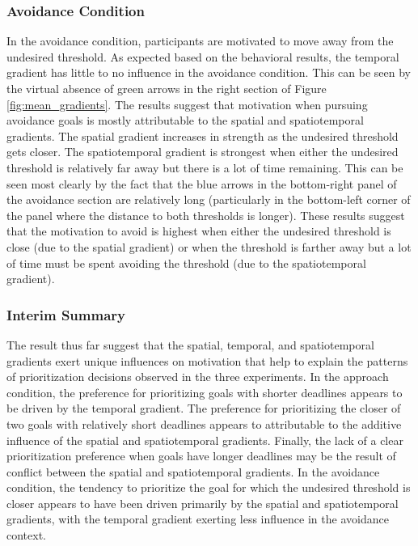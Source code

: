 \documentclass[a4paper,doc,natbib,donotrepeattitle]{apa6}
\begin{document}
\subsubsection{Avoidance Condition}

In the avoidance condition, participants are motivated to move away from the undesired threshold. As expected based on the behavioral results, the temporal gradient has little to no influence in the avoidance condition. This can be seen by the virtual absence of green arrows in the right section of Figure \ref{fig:mean_gradients}. The results suggest that motivation when pursuing avoidance goals is mostly attributable to the spatial and spatiotemporal gradients. The spatial gradient increases in strength as the undesired threshold gets closer. The spatiotemporal gradient is strongest when either the undesired threshold is relatively far away but there is a lot of time remaining. This can be seen most clearly by the fact that the blue arrows in the bottom-right panel of the avoidance section are relatively long (particularly in the bottom-left corner of the panel where the distance to both thresholds is longer). These results suggest that the motivation to avoid is highest when either the undesired threshold is close (due to the spatial gradient) or when the threshold is farther away but a lot of time must be spent avoiding the threshold (due to the spatiotemporal gradient).

\subsubsection{Interim Summary}

The result thus far suggest that the spatial, temporal, and spatiotemporal gradients exert unique influences on motivation that help to explain the patterns of prioritization decisions observed in the three experiments. In the approach condition, the preference for prioritizing goals with shorter deadlines appears to be driven by the temporal gradient. The preference for prioritizing the closer of two goals with relatively short deadlines appears to attributable to the additive influence of the spatial and spatiotemporal gradients. Finally, the lack of a clear prioritization preference when goals have longer deadlines may be the result of conflict between the spatial and spatiotemporal gradients. In the avoidance condition, the tendency to prioritize the goal for which the undesired threshold is closer appears to have been driven primarily by the spatial and spatiotemporal gradients, with the temporal gradient exerting less influence in the avoidance context.
\end{document}
